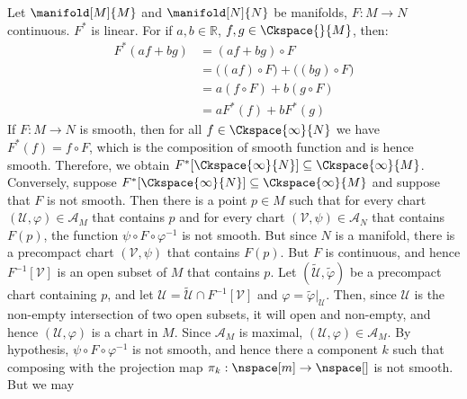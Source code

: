\documentclass{article}                                                        %
\begin{document}
        \begin{solution}
            Let $\manifold[M]{M}$ and $\manifold[N]{N}$ be manifolds,
            $F:M\rightarrow{N}$ continuous. $F^{*}$ is linear. For if
            $a,b\in\mathbb{R}$, $f,g\in\Ckspace{}{M}$, then:
            \begin{subequations}
                \begin{align}
                    F^{*}(af+bg)&=(af+bg)\circ{F}\\
                    &=\big((af)\circ{F}\big)+\big((bg)\circ{F}\big)\\
                    &=a(f\circ{F})+b(g\circ{F})\\
                    &=aF^{*}(f)+bF^{*}(g)
                \end{align}
            \end{subequations}
            If $F:M\rightarrow{N}$ is smooth, then for all
            $f\in\Ckspace{\infty}{N}$ we have $F^{*}(f)=f\circ{F}$, which is the
            composition of smooth function and is hence smooth. Therefore, we
            obtain $F^{*}[\Ckspace{\infty}{N}]\subseteq\Ckspace{\infty}{M}$.
            Conversely, suppose
            $F^{*}[\Ckspace{\infty}{N}]\subseteq\Ckspace{\infty}{M}$ and suppose
            that $F$ is not smooth. Then there is a point $p\in{M}$ such that
            for every chart $(\mathcal{U},\varphi)\in\mathcal{A}_{M}$ that
            contains $p$ and for every chart
            $(\mathcal{V},\psi)\in\mathcal{A}_{N}$ that contains $F(p)$, the
            function $\psi\circ{F}\circ\varphi^{\minus{1}}$ is not smooth. But
            since $N$ is a manifold, there is a precompact chart
            $(\mathcal{V},\psi)$ that contains $F(p)$. But $F$ is continuous,
            and hence $F^{\minus{1}}[\mathcal{V}]$ is an open subset of $M$ that
            contains $p$. Let $(\tilde{\mathcal{U}},\tilde{\varphi})$ be a
            precompact chart containing $p$, and let
            $\mathcal{U}=\tilde{\mathcal{U}}\cap{F}^{\minus{1}}[\mathcal{V}]$
            and $\varphi=\tilde{\varphi}|_{\mathcal{U}}$. Then, since
            $\mathcal{U}$ is the non-empty intersection of two open subsets,
            it will open and non-empty, and hence $(\mathcal{U},\varphi)$
            is a chart in $M$. Since $\mathcal{A}_{M}$ is maximal,
            $(\mathcal{U},\varphi)\in\mathcal{A}_{M}$. By hypothesis,
            $\psi\circ{F}\circ\varphi^{\minus{1}}$ is not smooth, and hence
            there a component $k$ such that composing with the projection map
            $\pi_{k}:\nspace[m]\rightarrow\nspace[]$ is not smooth. But we may

\end{solution}
\end{document}
